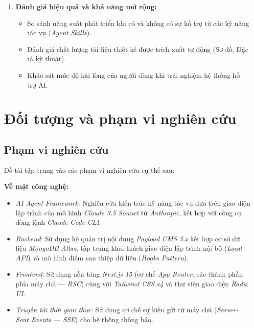 \documentclass[13pt,a4paper,oneside]{extreport}
\numberwithin{equation}{chapter}
\numberwithin{figure}{chapter}
\numberwithin{table}{chapter}
\begin{document}
\begin{enumerate}
    \item \textbf{Đánh giá hiệu quả và khả năng mở rộng:}
    \begin{itemize}
        \item So sánh năng suất phát triển khi có và không có sự hỗ trợ từ các kỹ năng tác vụ (\textit{Agent Skills}).
        \item Đánh giá chất lượng tài liệu thiết kế được trích xuất tự động (Sơ đồ, Đặc tả kỹ thuật).
        \item Khảo sát mức độ hài lòng của người dùng khi trải nghiệm hệ thống hỗ trợ AI.
    \end{itemize}
\end{enumerate}

\section*{Đối tượng và phạm vi nghiên cứu}

\subsection*{Phạm vi nghiên cứu}

Đề tài tập trung vào các phạm vi nghiên cứu cụ thể sau:

\textbf{Về mặt công nghệ:}
\begin{itemize}
    \item \textit{AI Agent Framework}: Nghiên cứu kiến trúc kỹ năng tác vụ dựa trên giao diện lập trình của mô hình \textit{Claude 3.5 Sonnet} từ \textit{Anthropic}, kết hợp với công cụ dòng lệnh \textit{Claude Code CLI}.
    \item \textit{Backend}: Sử dụng hệ quản trị nội dung \textit{Payload CMS 3.x} kết hợp cơ sở dữ liệu \textit{MongoDB Atlas}, tập trung khai thách giao diện lập trình nội bộ (\textit{Local API}) và mô hình điểm can thiệp dữ liệu (\textit{Hooks Pattern}).
    \item \textit{Frontend}: Sử dụng nền tảng \textit{Next.js 15} (cơ chế \textit{App Router}, các thành phần phía máy chủ — \textit{RSC}) cùng với \textit{Tailwind CSS v4} và thư viện giao diện \textit{Radix UI}.
    \item \textit{Truyền tải thời gian thực}: Sử dụng cơ chế sự kiện gửi từ máy chủ (\textit{Server-Sent Events — SSE}) cho hệ thống thông báo.
\end{itemize}
\end{document}
